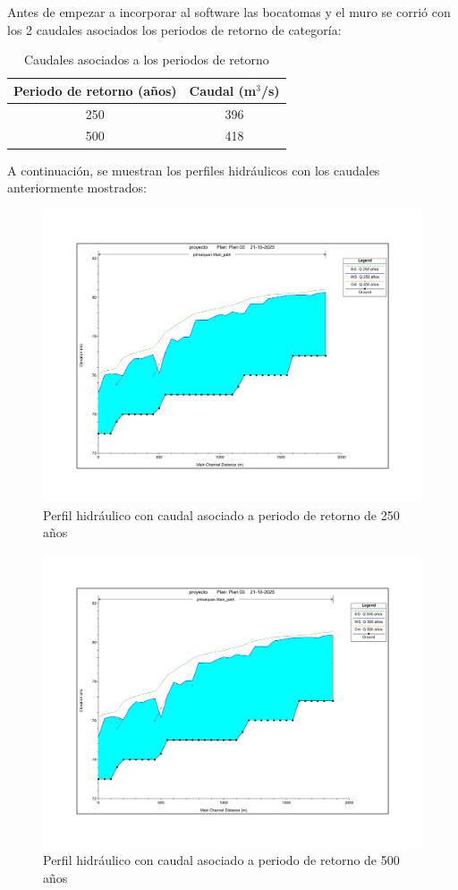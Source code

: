 \documentclass{article} %
\begin{document}
Antes de empezar a incorporar al software las bocatomas y el muro se corrió con los 2 caudales asociados los periodos de retorno de categoría:

\begin{table}[h]
    \centering
    \begin{tabular}{c c}
        \textbf{Periodo de retorno (años)} & \textbf{Caudal (m$^3$/s)} \\
        \hline
        250 & 396 \\ 
        500 & 418 \\\hline
    \end{tabular}
    \caption{Caudales asociados a los periodos de retorno}
\end{table}

A continuación, se muestran los perfiles hidráulicos con los caudales anteriormente mostrados:

\begin{figure}[H]
    \centering
    \includegraphics[width=0.6\linewidth]{imagenes/perfil_250_sb.pdf}
    \caption{Perfil hidráulico con caudal asociado a periodo de retorno de 250 años}
\end{figure}

\begin{figure}[H]
    \centering
    \includegraphics[width=0.6\linewidth]{imagenes/perfil_500_sb.pdf}
    \caption{Perfil hidráulico con caudal asociado a periodo de retorno de 500 años}
\end{figure}
\end{document}
